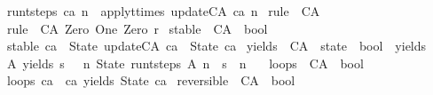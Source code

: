 \begin{isabellebody}
{\isachardoublequoteopen}run{\isacharunderscore}t{\isacharunderscore}steps\ ca\ n\ {\isacharequal}\ apply{\isacharunderscore}t{\isacharunderscore}times\ update{\isacharunderscore}CA\ ca\ n{\isachardoublequoteclose}%
\isadelimdocument
%
\endisadelimdocument
%
\isatagdocument
%
\isamarkuptrue%
%
\endisatagdocument
{\isafolddocument}%
%
\isadelimdocument
%
\endisadelimdocument
{}\isamarkupfalse%
\ rule{}{}{}\ {\isacharcolon}{\isacharcolon}\ CA\ \isanewline
{\isachardoublequoteopen}rule{}{}{}\ {\isasymequiv}\ CA\ {\isacharbrackleft}Zero{\isacharcomma}\ One{\isacharcomma}\ Zero{\isacharbrackright}\ r{}{}{}{\isachardoublequoteclose}%
\isadelimdocument
%
\endisadelimdocument
%
\isatagdocument
%
\isamarkuptrue%
%
\endisatagdocument
{\isafolddocument}%
%
\isadelimdocument
%
\endisadelimdocument
{}\isamarkupfalse%
\ stable\ {\isacharcolon}{\isacharcolon}\ {\isachardoublequoteopen}CA\ {\isasymRightarrow}\ bool{\isachardoublequoteclose}\ \isanewline
{\isachardoublequoteopen}stable\ ca\ {\isasymequiv}\ State\ {\isacharparenleft}update{\isacharunderscore}CA\ ca{\isacharparenright}\ {\isacharequal}\ State\ ca{\isachardoublequoteclose}\isanewline
\isanewline
{}\isamarkupfalse%
\ yields\ {\isacharcolon}{\isacharcolon}\ {\isachardoublequoteopen}CA\ {\isasymRightarrow}\ state\ {\isasymRightarrow}\ bool{\isachardoublequoteclose}\ {\isacharparenleft}\ {\isacartoucheopen}yields{\isacartoucheclose}\ \ {}{}{\isacharparenright}\ \isanewline
{\isachardoublequoteopen}A\ yields\ s\ {\isasymequiv}\ {\isacharparenleft}{\isasymexists}\ n{\isachardot}\ State\ {\isacharparenleft}run{\isacharunderscore}t{\isacharunderscore}steps\ A\ n{\isacharparenright}\ {\isacharequal}\ s\ {\isasymand}\ n\ {\isachargreater}\ {}{\isacharparenright}{\isachardoublequoteclose}\isanewline
\isanewline
{}\isamarkupfalse%
\ loops\ {\isacharcolon}{\isacharcolon}\ {\isachardoublequoteopen}CA\ {\isasymRightarrow}\ bool{\isachardoublequoteclose}\ \isanewline
{\isachardoublequoteopen}loops\ ca\ {\isasymequiv}\ ca\ yields\ State\ ca{\isachardoublequoteclose}\isanewline
\isanewline
\isanewline
{}\isamarkupfalse%
\ reversible\ {\isacharcolon}{\isacharcolon}\ {\isachardoublequoteopen}CA\ {\isasymRightarrow}\ bool{\isachardoublequoteclose}\ \isanewline

\end{isabellebody}
